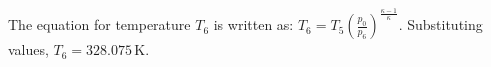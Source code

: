 The equation for temperature \( T_6 \) is written as:  
\( T_6 = T_5 \left( \frac{p_0}{p_6} \right)^{\frac{\kappa - 1}{\kappa}} \).  
Substituting values, \( T_6 = 328.075 \, \text{K} \).